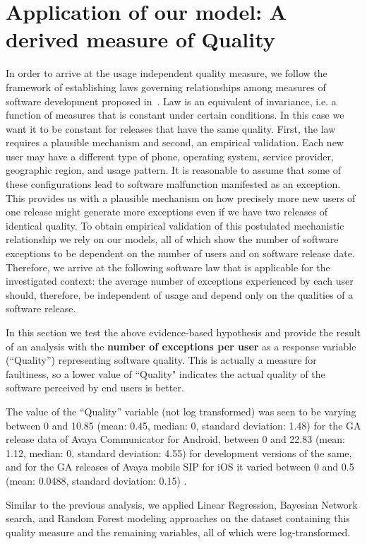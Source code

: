\documentclass[smallextended]{svjour3}       %
\begin{document}
\section{Application of our model: A derived measure of Quality}\label{s:qual}
In order to arrive at the usage independent quality measure, we follow the framework of establishing laws governing relationships among measures of software development proposed in~\cite{mockuskeynote}. Law is an equivalent of invariance, i.e. a function of measures that is constant under certain conditions. In this case we want it to be constant for releases that have the same quality. First, the law requires a plausible mechanism and second, an empirical validation. Each new user may have a different type of phone, operating system, service provider, geographic region, and usage pattern. It is reasonable to assume that some of these configurations lead to software malfunction manifested as an exception. This provides us with a plausible mechanism on how precisely more new users of one release might generate more exceptions even if we have two releases of identical quality. To obtain empirical validation of this postulated mechanistic relationship we rely on our models, all of which show the number of software 
exceptions to be dependent on the number of users and on software release date. Therefore,
we arrive at the following software law that is applicable for the investigated context: the average number of 
exceptions experienced by each user should, therefore, be independent of usage and depend only on the qualities of a software release.

In this section we test the above evidence-based hypothesis and provide the result of an analysis with the \textbf{number of exceptions per user} as a response variable (``Quality'') representing software quality. 
This is actually a measure for faultiness, so a lower value of ``Quality" indicates the actual quality of the software perceived by end users is better.

The value of the ``Quality'' variable (not log transformed) was seen to be varying between 0 and 10.85 (mean: 0.45, median: 0, standard deviation: 1.48) for the GA release data of Avaya Communicator for Android, between 0 and 22.83 (mean: 1.12, median: 0, standard deviation: 4.55) for development versions of the same, and for the GA releases of Avaya mobile SIP for iOS it varied between 0 and 0.5 (mean: 0.0488, standard deviation: 0.15) . %

Similar to the previous analysis, we applied Linear Regression, Bayesian Network search, and 
Random Forest modeling approaches on the dataset containing this quality measure and the remaining variables, all of which were log-transformed. 
\end{document}

